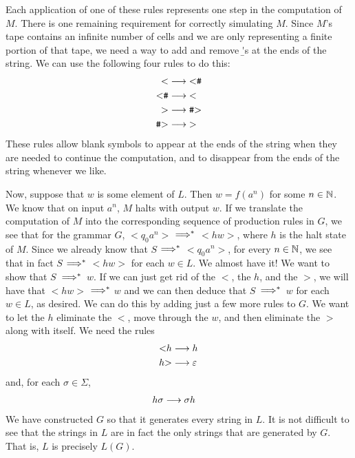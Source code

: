 Each application of one of these rules represents one step in
the computation of $M$.   There is one remaining requirement for correctly
simulating $M$.  Since $M$'s tape contains an infinite number of cells
and we are only representing a finite portion of that tape, we need a way
to add and remove \b's at the ends of the string.  We can use the
following four rules to do this:
\begin{align*}
   \hbox{$<$}&\longrightarrow \hbox{$<${\tt\#}}\\
   \hbox{$<${\tt\#}}&\longrightarrow \hbox{$<$}\\
   \hbox{$>$}&\longrightarrow \hbox{{\tt\#}$>$}\\
   \hbox{{\tt\#}$>$}&\longrightarrow \hbox{$>$}\\
\end{align*}
These rules allow blank symbols to appear at the ends of the string
when they are needed to continue the computation, and to disappear
from the ends of the string whenever we like.

Now, suppose that $w$ is some element of $L$.  Then $w=f(a^n)$ for some $n\in{\mathbb N}$.
We know that on input $a^n$, $M$ halts with output $w$.  If we
translate the computation of $M$ into the corresponding sequence
of production rules in $G$,
we see that for the grammar $G$, $<${}$q_0a^n${}$>$
${\Longrightarrow}^*$ $<${}$hw${}$>$, where $h$ is the halt state of $M$.
Since we already know that $S$ ${\Longrightarrow}^*$ $<${}$q_0a^n${}$>$,
for every $n\in{\mathbb N}$, we see that in fact $S$ ${\Longrightarrow}^*$ 
$<${}$hw${}$>$ for each $w\in L$.  We almost have it! We
want to show that $S$~${\Longrightarrow}^*$~$w$.
If we can just
get rid of the $<$, the $h$, and the $>$, we will have that
$<${}$hw${}$>$ ${\Longrightarrow}^*$ $w$ and we can then deduce that
$S$~${\Longrightarrow}^*$~$w$ for each $w\in L$, as desired.  We can do this by adding 
just a few more rules to $G$.  We want to let the $h$ eliminate the $<$,
move through the $w$, and then eliminate the $>$ along with itself.
We need the rules
\begin{align*}
   \hbox{$<$}h&\longrightarrow h\\
   h\hbox{$>$}&\longrightarrow \varepsilon
\end{align*}
and, for each $\sigma\in\Sigma$,
\begin{align*}
   h\sigma&\longrightarrow \sigma h
\end{align*}
We have constructed $G$ so that it generates every string in $L$.
It is not difficult to see that the strings in $L$ are in fact the
only strings that are generated by $G$.  That is, $L$ is precisely
$L(G)$.

